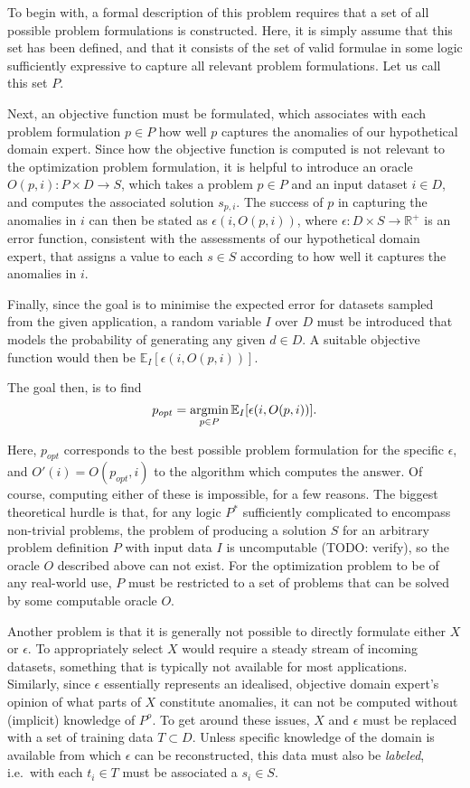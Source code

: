 To begin with, a formal description of this problem requires that a set of all possible problem formulations is constructed. Here, it is simply assume that this set has been defined, and that it consists of the set of valid formulae in some logic sufficiently expressive to capture all relevant problem formulations. Let us call this set $P$.

Next, an objective function must be formulated, which associates with each problem formulation $p \in P$ how well $p$ captures the anomalies of our hypothetical domain expert. Since how the objective function is computed is not relevant to the optimization problem formulation, it is helpful to introduce an oracle $O(p, i): P \times D \rightarrow S$, which takes a problem $p \in P$ and an input dataset $i \in D$, and computes the associated solution $s_{p,i}$. The success of $p$ in capturing the anomalies in $i$ can then be stated as $\epsilon(i, O(p, i))$, where $\epsilon: D \times S \rightarrow \mathbb{R}^+$ is an error function, consistent with the assessments of our hypothetical domain expert, that assigns a value to each $s \in S$ according to how well it captures the anomalies in $i$.

Finally, since the goal is to minimise the expected error for datasets sampled from the given application, a random variable $I$ over $D$ must be introduced that models the probability of generating any given $d \in D$. A suitable objective function would then be $\mathbb{E}_I [\epsilon(i, O(p, i))]$.

The goal then, is to find 
\[
    p_{opt} = \argmin_{p \in P}\mathbb{E}_I [ \epsilon(i, O(p, i)) ].
\]

Here, $p_{opt}$ corresponds to the best possible problem formulation for the specific $\epsilon$, and $O'(i) = O(p_{opt}, i)$ to the algorithm which computes the answer. Of course, computing either of these is impossible, for a few reasons. The biggest theoretical hurdle is that, for any logic $P^*$ sufficiently complicated to encompass non-trivial problems, the problem of producing a solution $S$ for an arbitrary problem definition $P$ with input data $I$ is uncomputable (TODO: verify), so the oracle $O$ described above can not exist. For the optimization problem to be of any real-world use, $P$ must be restricted to a set of problems that can be solved by some computable oracle $O$.

Another problem is that it is generally not possible to directly formulate either $X$ or $\epsilon$. To appropriately select $X$ would require a steady stream of incoming datasets, something that is typically not available for most applications. Similarly, since $\epsilon$ essentially represents an idealised, objective domain expert's opinion of what parts of $X$ constitute anomalies, it can not be computed without (implicit) knowledge of $P^o$. To get around these issues, $X$ and $\epsilon$ must be replaced with a set of training data $T \subset D$. Unless specific knowledge of the domain is available from which $\epsilon$ can be reconstructed, this data must also be \emph{labeled}, i.e.\ with each $t_i \in T$ must be associated a $s_i \in S$.

